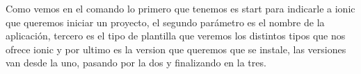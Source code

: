 \documentclass[a4paper, 11pt]{article}
\begin{document}
\begin{itemize}
            Como vemos en el comando lo primero que tenemos es start para indicarle
            a ionic que queremos iniciar un proyecto, el segundo parámetro es el
            nombre de la aplicación, tercero es el tipo de plantilla que veremos los
            distintos tipos que nos ofrece ionic y por ultimo es la version que
            queremos que se instale, las versiones van desde la uno, pasando por la
            dos y finalizando en la tres.


                   \begin{figure}[H]
                     \centering

\end{figure}
\end{itemize}
\end{document}
